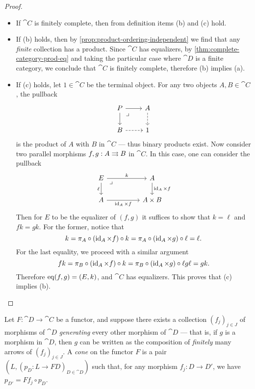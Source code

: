 \begin{proof}
\begin{itemize}\setlength\itemsep{0em}
\item If \(\cat C\) is finitely complete, then from definition items (b) and (c)
  hold.
\item If (b) holds, then by \cref{prop:product-ordering-independent} we find
  that any \emph{finite} collection has a product. Since \(\cat C\) has
  equalizers, by \cref{thm:complete-category-prod-eq} and taking the particular
  case where \(\cat D\) is a finite category, we conclude that \(\cat C\) is
  finitely complete, therefore (b) implies (a).
\item If (c) holds, let \(1 \in \cat C\) be the terminal object. For any two
  objects \(A, B \in \cat C\), the pullback
  \[
  \begin{tikzcd}
  P \ar[r] \ar[d] \ar[rd, phantom, very near start, "\lrcorner"]
  &A \ar[d, dashed] \\
  B \ar[r, dashed] &1
  \end{tikzcd}
  \]
  is the product of \(A\) with \(B\) in \(\cat C\) --- thus binary products
  exist. Now consider two parallel morphisms \(f, g: A \rightrightarrows B\) in \(\cat
  C\). In this case, one can consider the pullback
  \[
  \begin{tikzcd}
  E \ar[rr, "k"]  \ar[d, "\ell"']
  \ar[rrd, phantom, very near start, "\lrcorner"]
  &&A \ar[d, "\Id_A \times f"] \\
  A \ar[rr, "\Id_A \times f"']
  &&A \times B
  \end{tikzcd}
  \]
  Then for \(E\) to be the equalizer of \((f,g)\) it suffices to show that
  \(k = \ell\) and \(f k = g k\). For the former, notice that
  \[
  k = \pi_A \circ (\operatorname{id}_A \times f) \circ k
  = \pi_A \circ (\operatorname{id}_A \times g) \circ \ell
  = \ell.
  \]
  For the last equality, we proceed with a similar argument
  \[
  f k = \pi_B \circ (\operatorname{id}_A \times f) \circ k
  = \pi_B \circ (\operatorname{id}_A \times g) \circ \ell
  g \ell
  = g k.
  \]
  Therefore \(\operatorname{eq}(f, g) = (E, k)\), and \(\cat C\) has equalizers. This proves
  that (c) implies (b).
\end{itemize}
\end{proof}

\begin{proposition}
\label{prop:equiv-def-cone-on-func-from-graph}
Let \(F: \cat D \to \cat C\) be a functor, and suppose there exists a collection
\((f_j)_{j \in J}\) of morphisms of \(\cat D\) \emph{generating} every other
morphism of \(\cat D\) --- that is, if \(g\) is a morphism in \(\cat D\), then
\(g\) can be written as the composition of \emph{finitely} many arrows of
\((f_j)_{j \in J}\). A \emph{cone} on the functor \(F\) is a pair \((L, (p_D: L
\to F D)_{D \in \cat D})\) such that, for any morphism \(f_j: D \to D'\), we
have \(p_{D'} = F f_j \circ p_D\).
\end{proposition}

